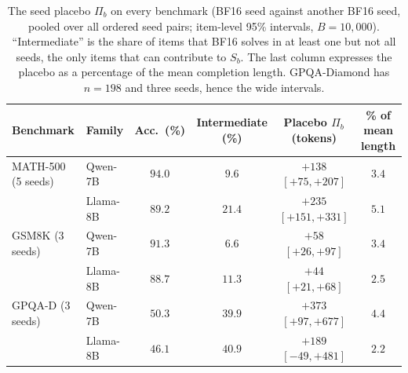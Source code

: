 \begin{table}[t]
\centering
\caption{The seed placebo $\Pi_b$ on every benchmark (BF16 seed against another BF16 seed, pooled over all ordered seed pairs; item-level 95\% intervals, $B=10{,}000$). ``Intermediate'' is the share of items that BF16 solves in at least one but not all seeds, the only items that can contribute to $S_b$. The last column expresses the placebo as a percentage of the mean completion length. GPQA-Diamond has $n=198$ and three seeds, hence the wide intervals.}
\label{tab:crossbench}
\small
\begin{tabular}{llcccc}
\toprule
\textbf{Benchmark} & \textbf{Family} & \textbf{Acc.\ (\%)} & \textbf{Intermediate (\%)} & \textbf{Placebo $\Pi_b$ (tokens)} & \textbf{\% of mean length} \\
\midrule
MATH-500 (5 seeds) & Qwen-7B & $94.0$ & $9.6$ & $+138$ $[+75,+207]$ & $3.4$ \\
 & Llama-8B & $89.2$ & $21.4$ & $+235$ $[+151,+331]$ & $5.1$ \\
\midrule
GSM8K (3 seeds) & Qwen-7B & $91.3$ & $6.6$ & $+58$ $[+26,+97]$ & $3.4$ \\
 & Llama-8B & $88.7$ & $11.3$ & $+44$ $[+21,+68]$ & $2.5$ \\
\midrule
GPQA-D (3 seeds) & Qwen-7B & $50.3$ & $39.9$ & $+373$ $[+97,+677]$ & $4.4$ \\
 & Llama-8B & $46.1$ & $40.9$ & $+189$ $[-49,+481]$ & $2.2$ \\
\bottomrule
\end{tabular}
\end{table}
